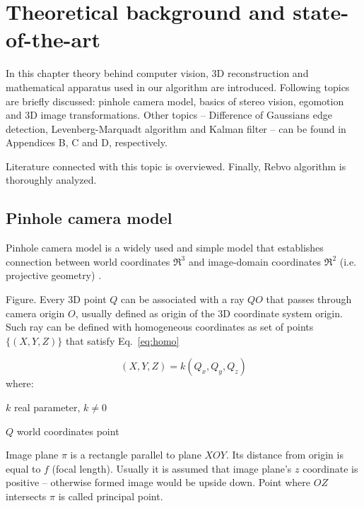 \chapter{Theoretical background and state-of-the-art}
\label{cha:intro}


In this chapter theory behind computer vision, 3D reconstruction and mathematical apparatus used in our algorithm are introduced. Following topics are briefly discussed: pinhole camera model, basics of stereo vision, egomotion and 3D image transformations. Other topics -- Difference of Gaussians edge detection, Levenberg-Marquadt algorithm and Kalman filter -- can be found in Appendices B, C and D, respectively.

Literature connected with this topic is overviewed. Finally, Rebvo algorithm \cite{jose2015realtime} is thoroughly analyzed.


\section{Pinhole camera model}
\label{sec:pinhole}


Pinhole camera model is a widely used and simple model that establishes connection between world coordinates $\Re^3$ and image-domain coordinates $\Re^2$ (i.e. projective geometry) \cite{hartley2003multiple}.

Figure. Every 3D point $Q$ can be associated with a ray $QO$ that passes through camera origin $O$, usually defined as origin of the 3D coordinate system origin. Such ray can be defined with homogeneous coordinates as set of points $\{(X, Y, Z)\}$ that satisfy Eq.~\ref{eq:homo}

\begin{equation}
(X, Y, Z) = k(Q_x, Q_y, Q_z)
\label{eq:homo}
\end{equation}
where:
\begin{eqwhere}[2cm]
	\item[$k$] real parameter, \(k \neq 0\)
	\item[$Q$] world coordinates point
\end{eqwhere}

Image plane \(\pi\) is a rectangle parallel to plane \(XOY\). Its distance from origin is equal to \(f\) (focal length). Usually it is assumed that image plane's \(z\) coordinate is positive -- otherwise formed image would be upside down. Point where \(OZ\) intersects \(\pi\) is called principal point.

